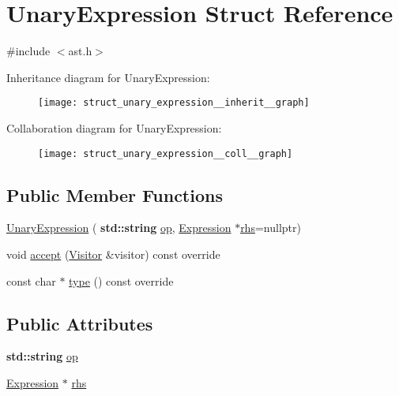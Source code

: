 \hypertarget{struct_unary_expression}{}\section{Unary\+Expression Struct Reference}
\label{struct_unary_expression}


{\ttfamily \#include $<$ast.\+h$>$}



Inheritance diagram for Unary\+Expression\+:
\nopagebreak
\begin{figure}[H]
\begin{center}
\leavevmode
\texttt{[image: struct\_unary\_expression\_\_inherit\_\_graph]}
\end{center}
\end{figure}


Collaboration diagram for Unary\+Expression\+:
\nopagebreak
\begin{figure}[H]
\begin{center}
\leavevmode
\texttt{[image: struct\_unary\_expression\_\_coll\_\_graph]}
\end{center}
\end{figure}
\subsection*{Public Member Functions}
\begin{DoxyCompactItemize}
\item 
\hyperlink{struct_unary_expression_a0a2158571198f271b43612707666e8fa}{Unary\+Expression} (\textbf{ std\+::string} \hyperlink{struct_unary_expression_a057cfd54844d5b36e15f16ee5272b071}{op}, \hyperlink{struct_expression}{Expression} $\ast$\hyperlink{struct_unary_expression_a53e53c6c0a0b76c46cb49a1fa48be5a5}{rhs}=nullptr)
\item 
void \hyperlink{struct_unary_expression_a88c89a0268ecfa5008b5afe7bc47913a}{accept} (\hyperlink{struct_visitor}{Visitor} \&visitor) const override
\item 
const char $\ast$ \hyperlink{struct_unary_expression_ae98f7830a67f58e467de4bae7af035ab}{type} () const override
\end{DoxyCompactItemize}
\subsection*{Public Attributes}
\begin{DoxyCompactItemize}
\item 
\textbf{ std\+::string} \hyperlink{struct_unary_expression_a057cfd54844d5b36e15f16ee5272b071}{op}
\item 
\hyperlink{struct_expression}{Expression} $\ast$ \hyperlink{struct_unary_expression_a53e53c6c0a0b76c46cb49a1fa48be5a5}{rhs}
\end{DoxyCompactItemize}


